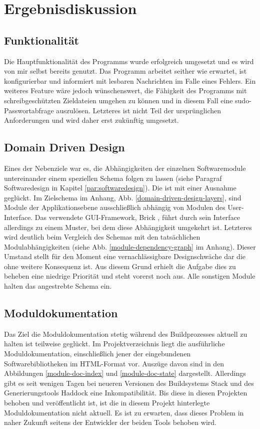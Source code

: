 \section{Ergebnisdiskussion} \label{Ergebnisdiskussion}

\subsection{Funktionalität}
Die Hauptfunktionalität des Programms wurde erfolgreich umgesetzt und es wird von
mir selbst bereits genutzt. Das Programm arbeitet seither wie erwartet,
ist konfigurierbar und informiert mit lesbaren Nachrichten im Falle eines Fehlers.
Ein weiteres Feature wäre jedoch wünschenswert, die Fähigkeit des Programms mit
schreibgeschützten Zieldateien umgehen zu können und in diesem Fall eine
sudo-Passwortabfrage auszulösen. Letzteres ist nicht Teil der
ursprünglichen Anforderungen und wird daher erst zukünftig umgesetzt.

\subsection{Domain Driven Design} \label{domain-driven-design-result}
Eines der Nebenziele war es, die Abhängigkeiten der einzelnen Softwaremodule
untereinander einem speziellen Schema folgen zu lassen (siehe Paragraf
Softwaredesign in Kapitel \ref{par:softwaredesign}). Die ist mit einer Ausnahme
geglückt. Im Zielschema im Anhang, Abb. \ref{domain-driven-design-layers}, sind Module
der Applikationsebene ausschließlich abhängig von Modulen des User-Interface.
Das verwendete \gls{GUI}-Framework, Brick \cite{brick}, führt durch sein Interface allerdings
zu einem Muster, bei dem diese Abhängigkeit umgekehrt ist. Letzteres wird deutlich
beim Vergleich des Schemas mit den tatsächlichen Modulabhängigkeiten (siehe Abb.
\ref{module-dependency-graph} im Anhang). Dieser Umstand stellt für den Moment
eine vernachlässigbare Designschwäche dar die ohne weitere
Konsequenz ist. Aus diesem Grund erhielt die Aufgabe dies zu beheben eine niedrige
Priorität und steht vorerst noch aus. Alle sonstigen Module halten das angestrebte
Schema ein.

\subsection{Moduldokumentation}
Das Ziel die Moduldokumentation stetig während des Buildprozesses aktuell zu
halten ist teilweise geglückt. Im Projektverzeichnis liegt die ausführliche Moduldokumentation,
einschließlich jener der eingebundenen Softwarebibliotheken im HTML-Format vor.
Auszüge davon sind in den Abbildungen \ref{module-doc-index} und \ref{module-doc-state} dargestellt.
Allerdings gibt es seit wenigen Tagen bei neueren Versionen des Buildsystems Stack \cite{stack}
und des Generierungstools Haddock \cite{haddock} eine Inkompatibilität. Bis diese
in diesen Projekten behoben und veröffentlicht ist, ist die in diesem Projekt hinterlegte
Moduldokumentation nicht aktuell. Es ist zu erwarten, dass dieses Problem in naher
Zukunft seitens der Entwickler der beiden Tools behoben wird.

